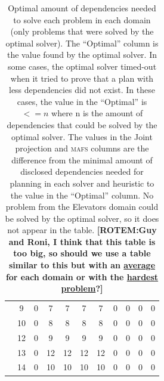 \documentclass{article}
\newcommand{\mafs}{\textsc {mafs}\xspace}
\newcommand{\rotem}[1]{\textbf{\color{red}[ROTEM:#1]}}
\theoremstyle{remark}
\begin{document}
{\begin{table}[ht]
\begin{tabular}{|cc||c||c|c|c|c||c|c|c|c|}
                                              & 9                        & 0                        & 7                  & 7                  & 7                 & 7                 & 0                  & 0                  & 0                 & 0                  \\ \cline{2-11} 
                                              & 10                       & 0                        & 8                  & 8                  & 8                 & 8                 & 0                  & 0                  & 0                 & 0                  \\ \cline{2-11} 
                                              & 12                       & 0                        & 9                  & 9                  & 9                 & 9                 & 0                  & 0                  & 0                 & 0                  \\ \cline{2-11} 
                                              & 13                       & 0                        & 12                 & 12                 & 12                & 12                & 0                  & 0                  & 0                 & 0                  \\ \cline{2-11} 
                                              & 14                       & 0                        & 10                 & 10                 & 10                & 10                & 0                  & 0                  & 0                 & 0                  \\ \hline
\end{tabular}
\caption{Optimal amount of dependencies needed to solve each problem in each domain (only problems that were solved by the optimal solver). The ``Optimal'' column is the value found by the optimal solver. In some cases, the optimal solver timed-out when it tried to prove that a plan with less dependencies did not exist. In these cases, the value in the ``Optimal'' is $<= n$ where n is the amount of dependencies that could be solved by the optimal solver. The values in the Joint projection and \mafs columns are the difference from the minimal amount of disclosed dependencies needed for planning in each solver and heuristic to the value in the ``Optimal'' column. No problem from the Elevators domain could be solved by the optimal solver, so it does not appear in the table.
\rotem{Guy and Roni, I think that this table is too big, so should we use a table similar to this but with an \underline{average} for each domain or with the \underline{hardest problem}?}}
\label{table:optimalTable}
\end{table}

}
\end{document}
